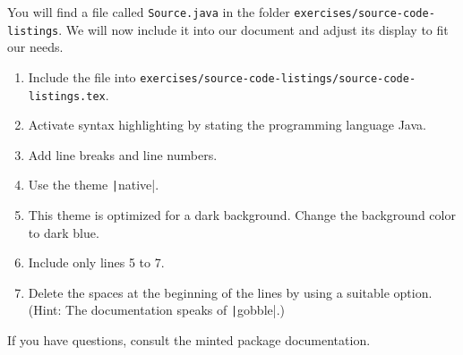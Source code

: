 You will find a file called \texttt{Source.java} in the folder \texttt{exercises/source-code-listings}.
We will now include it into our document and adjust its display to fit our needs.

\begin{enumerate}
  \item Include the file into \texttt{exercises/source-code-listings/source-code-listings.tex}.
  \item Activate syntax highlighting by stating the programming language Java.
  \item Add line breaks and line numbers.
  \item Use the theme \texttt|native|.
  \item This theme is optimized for a dark background. Change the background color to dark blue.
  \item Include only lines 5 to 7.
  \item Delete the spaces at the beginning of the lines by using a suitable option. (Hint: The documentation speaks of \texttt|gobble|.)
\end{enumerate}

\noindent If you have questions, consult the minted package documentation.

\usemintedstyle{} %
